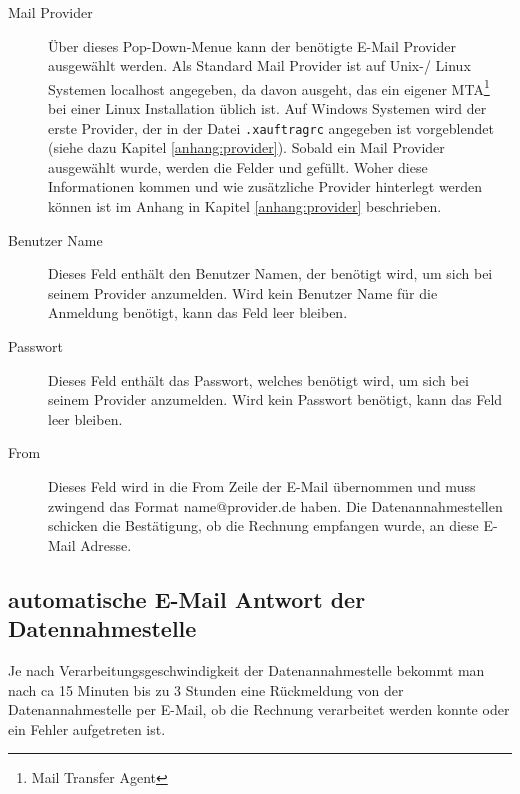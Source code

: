 \begin{description}
\item[Mail Provider]
Über dieses Pop-Down-Menue kann der benötigte E-Mail Provider ausgewählt
werden. Als Standard Mail Provider ist auf Unix-/ Linux Systemen localhost 
angegeben, 
da \tinyHeb\/ davon ausgeht, das ein 
eigener MTA\footnote{Mail Transfer Agent} bei einer Linux
Installation üblich ist. Auf Windows Systemen wird der erste Provider,
der in der Datei \verb|.xauftragrc| angegeben ist vorgeblendet (siehe
dazu Kapitel \vref{anhang:provider}).
Sobald ein Mail Provider ausgewählt wurde, werden die Felder
 und  gefüllt. Woher diese
Informationen kommen und wie zusätzliche Provider hinterlegt werden
können ist im Anhang in Kapitel \vref{anhang:provider} beschrieben.

\item[Benutzer Name]
Dieses Feld enthält den Benutzer Namen, der benötigt wird, um sich bei
seinem Provider anzumelden. Wird kein Benutzer Name für die Anmeldung
benötigt, kann das Feld leer bleiben.

\item[Passwort]
Dieses Feld enthält das Passwort, welches benötigt wird, um sich bei seinem
Provider anzumelden. Wird kein Passwort benötigt, kann das Feld leer
bleiben.

\item[From]
Dieses Feld wird in die From Zeile der E-Mail übernommen und muss
zwingend das Format name@provider.de haben. Die Datenannahmestellen
schicken die Bestätigung, ob die Rechnung empfangen wurde, an diese
E-Mail Adresse.
\end{description}

\subsection{automatische E-Mail Antwort der Datennahmestelle}
Je nach Verarbeitungsgeschwindigkeit
der Datenannahmestelle bekommt man nach ca 15 Minuten bis zu 3 Stunden eine
Rückmeldung von der Datenannahmestelle per E-Mail, ob die Rechnung
verarbeitet werden konnte oder ein Fehler aufgetreten ist.

